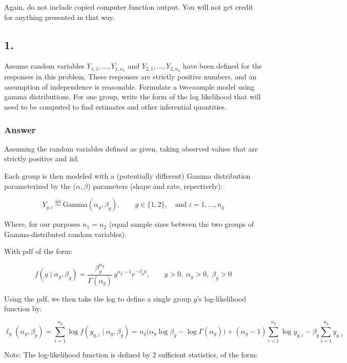 \documentclass[
]{article}
\begin{document}
Again, do not include copied computer function output. You will not get
credit for anything presented in that way.

\newpage

\subsection{1.}\label{section}

Assume random variables \(Y_{1,1}, \ldots, Y_{1,n_1}\) and
\(Y_{2,1}, \ldots, Y_{2,n_2}\) have been defined for the responses in
this problem. These responses are strictly positive numbers, and an
assumption of independence is reasonable. Formulate a two-sample model
using gamma distributions. For one group, write the form of the log
likelihood that will need to be computed to find estimates and other
inferential quantities.

\subsubsection{Answer}\label{answer}

Assuming the random variables defined as given, taking observed values
that are strictly positive and iid.

Each group is then modeled with a (potentially different) Gamma
distribution parameterized by the (\(\alpha, \beta\)) parameters (shape
and rate, repectively):

\[
Y_{g,i}\;\stackrel{\text{iid}}{\sim}\;\mathrm{Gamma}(\alpha_g,\beta_g), \qquad g\in\{1,2\},\quad \text{and } i=1,\dots,n_g
\]

Where, for our purposes \(n_{1} = n_{2}\) (equal sample sizes between
the two groups of Gamma-distributed random variables).

With pdf of the form:

\[
f(y\mid \alpha_g,\beta_g)=\frac{\beta_g^{\alpha_g}}{\Gamma(\alpha_g)}\,y^{\alpha_g-1}e^{-\beta_g y},\qquad y>0,\;\alpha_g>0,\;\beta_g>0
\]

Using the pdf, we then take the log to define a single group \(g\)'s
log-likelihood function by:

\[
\ell_g(\alpha_g,\beta_g)
= \sum_{i=1}^{n_g}\log f(y_{g,i}\mid \alpha_g,\beta_g)
= n_g\Big(\alpha_g\log\beta_g-\log\Gamma(\alpha_g)\Big)
+(\alpha_g-1)\sum_{i=1}^{n_g}\log y_{g,i}
-\beta_g\sum_{i=1}^{n_g} y_{g,i}
\]

Note: The log-likelihood function is defined by 2 sufficient statistics,
of the form:
\end{document}
